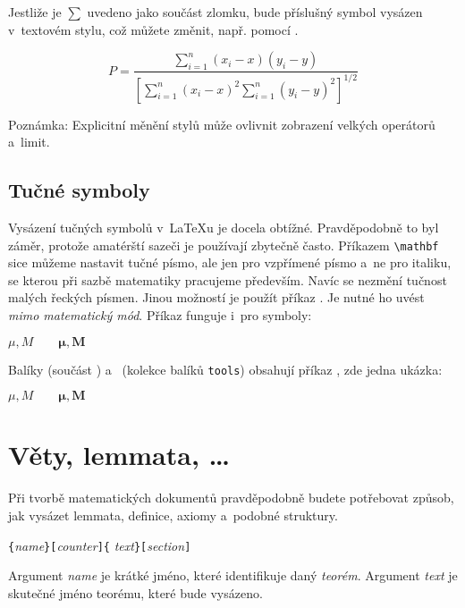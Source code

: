 Jestliže je $\sum$ uvedeno jako součást zlomku, bude příslušný
symbol vysázen v~textovém stylu, což můžete změnit, např. pomocí
.
\begin{example}
\begin{equation*}
 P = \frac{\displaystyle{ 
   \sum_{i=1}^n(x_i-x)
     (y_i-y)}} 
   {\displaystyle{\left[
   \sum_{i=1}^n(x_i-x)^2
   \sum_{i=1}^n(y_i-y)^2
   \right]^{1/2}}}
\end{equation*}    
\end{example}
Poznámka: Explicitní měnění stylů může ovlivnit zobrazení velkých operátorů
a~limit.



\subsection{Tučné symboly}

Vysázení tučných symbolů v~\LaTeX u je docela obtížné. Pravděpodobně
to byl záměr, protože amatérští sazeči je používají zbytečně často.
Příkazem \verb|\mathbf| sice můžeme nastavit tučné písmo, ale
jen pro vzpřímené písmo a~ne pro italiku, se kterou při sazbě matematiky
pracujeme především. Navíc se nezmění tučnost malých řeckých písmen.
Jinou možností je použít příkaz . Je nutné ho uvést
\emph{mimo matematický mód}. Příkaz  funguje i~pro symboly:
\begin{example}
$\mu, M \qquad 
\mathbf{\mu}, \mathbf{M}$
\qquad {}
\end{example}

Balíky  (součást ) a~
(kolekce balíků \texttt{tools}) obsahují příkaz , zde jedna ukázka:

\begin{example}
$\mu, M \qquad
\boldsymbol{\mu},
\boldsymbol{M}$
\end{example}


\section{Věty, lemmata, \ldots}

Při tvorbě matematických dokumentů pravděpodobně budete 
potřebovat způsob, jak vysázet lemmata, definice, axiomy
a~podobné struktury.
\begin{lscommand}
\verb|{|\emph{name}\verb|}[|\emph{counter}\verb|]{|%
         \emph{text}\verb|}[|\emph{section}\verb|]|
\end{lscommand}
Argument \emph{name} je krátké jméno, které identifikuje daný
\emph{teorém}. Argument \emph{text} je skutečné jméno
teorému, které bude vysázeno.

